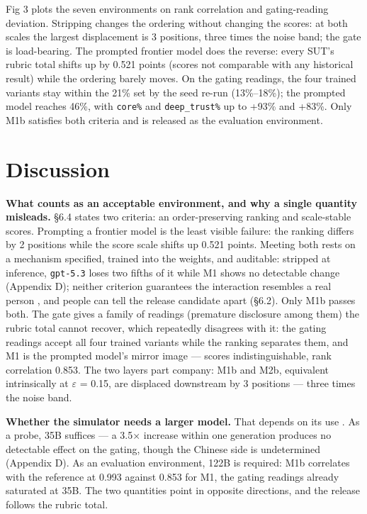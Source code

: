 \documentclass[letterpaper]{article}
\begin{document}
Fig 3 plots the seven environments on rank correlation and gating-reading deviation. Stripping changes the ordering without changing the scores: at both scales the largest displacement is 3 positions, three times the noise band; the gate is load-bearing. The prompted frontier model does the reverse: every SUT's rubric total shifts up by 0.521 points (scores not comparable with any historical result) while the ordering barely moves. On the gating readings, the four trained variants stay within the 21\% set by the seed re-run (13\%--18\%); the prompted model reaches 46\%, with \texttt{core\%} and \texttt{deep\_trust\%} up to +93\% and +83\%. Only M1b satisfies both criteria and is released as the evaluation environment.


\section{Discussion}

\textbf{What counts as an acceptable environment, and why a single quantity misleads.} \S{}6.4 states two criteria: an order-preserving ranking and scale-stable scores. Prompting a frontier model is the least visible failure: the ranking differs by 2 positions while the score scale shifts up 0.521 points. Meeting both rests on a mechanism specified, trained into the weights, and auditable: stripped at inference, \texttt{gpt-5.3} loses two fifths of it while M1 shows no detectable change (Appendix D); neither criterion guarantees the interaction resembles a real person \citep{simevalir}, and people can tell the release candidate apart (\S{}6.2). Only M1b passes both. The gate gives a family of readings (premature disclosure among them) the rubric total cannot recover, which repeatedly disagrees with it: the gating readings accept all four trained variants while the ranking separates them, and M1 is the prompted model's mirror image --- scores indistinguishable, rank correlation 0.853. The two layers part company: M1b and M2b, equivalent intrinsically at $\varepsilon$ = 0.15, are displaced downstream by 3 positions --- three times the noise band.

\textbf{Whether the simulator needs a larger model.} That depends on its use \citep{psibench}. As a probe, 35B suffices --- a 3.5$\times$ increase within one generation produces no detectable effect on the gating, though the Chinese side is undetermined (Appendix D). As an evaluation environment, 122B is required: M1b correlates with the reference at 0.993 against 0.853 for M1, the gating readings already saturated at 35B. The two quantities point in opposite directions, and the release follows the rubric total.
\end{document}
